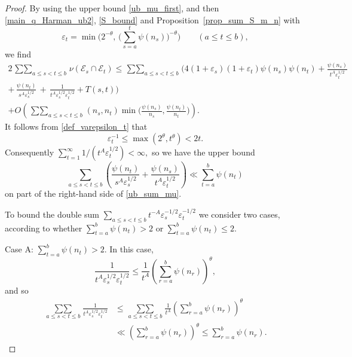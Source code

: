 \documentclass[12pt, reqno]{amsart}
\theoremstyle{definition}
\theoremstyle{remark}
\numberwithin{equation}{section}
\def\le{\leqslant} \def\ge{\geqslant}
\def\leq{\leqslant}
\def \cE {\mathcal E}
\begin{document}
\begin{proof}
By using the upper bound \eqref{ub_mu_first}, and then \eqref{main_q_Harman_ub2}, \eqref{S_bound} and Proposition~\ref{prop_sum_S_m_n}  with
\begin{equation} \label{def_varepsilon_t}
\varepsilon_t =
\min\Bigg(2^{-\theta},\, \Big( \sum_{s=a}^{t}\psi(n_s) \Big)^{-\theta}\Bigg)
\qquad (a \le t \le b),
\end{equation}
we find
\begin{multline} \label{ub_sum_mu}
2 \mathop{\sum\sum}_{a\leq s<t\leq b} \nu(\cE_{s}\cap \cE_{t}) \leq
\mathop{\sum\sum}_{a\leq s<t\leq b}
\Bigg(4(1+\varepsilon_s)(1+\varepsilon_t)\psi(n_s)\psi(n_t)+\frac{\psi(n_s)}{t^{A}\varepsilon_t^{1/2}}\,\\
+\, 
\frac{\psi(n_t)}{s^{A}\varepsilon_s^{1/2}}
\, + \, \frac{1}{t^{A}\varepsilon_s^{1/2}\varepsilon_t^{1/2}}+T(s,t)\Bigg)\\
+ O\left(\mathop{\sum\sum}_{a\leq s<t\leq b} (n_s,n_t)\min\Big(\frac{\psi(n_s)}{n_s},\frac{\psi(n_t)}{n_t}\Big)\right).
\end{multline}
It follows from \eqref{def_varepsilon_t} that
\begin{equation} \label{epsilon_inverse_bound}
\varepsilon_t^{-1} \leq \max\left(2^{\theta},t^{\theta}\right) < 2t.
\end{equation}
Consequently $\sum\limits_{t=1}^{\infty}1/(t^{A}\varepsilon_t^{1/2}) <\infty,$ so we have the  upper bound
\begin{equation} \label{ub_first_two_terms}
\sum_{a\leq s<t\leq b}\left(\frac{\psi(n_t)}{s^{A}\varepsilon_s^{1/2}} + \frac{\psi(n_s)}{t^{A}\varepsilon_t^{1/2}}\right)
\ll
\sum_{t=a}^b \psi(n_t)
\end{equation}
on part of the right-hand side of \eqref{ub_sum_mu}.

To bound the double sum $\sum\limits_{a\leq s<t\leq b} t^{-A}\varepsilon_s^{-1/2}\varepsilon_t^{-1/2}$ we consider two cases, according to whether $\sum\limits_{t=a}^{b}\psi(n_t)>2$ or $\sum\limits_{t=a}^{b}\psi(n_t)\leq 2$.

\noindent Case A: $\sum\limits_{t=a}^{b}\psi(n_t)>2$.  In this case,
\[
\frac{1}{t^{A}\varepsilon_s^{1/2}\varepsilon_t^{1/2}}
\leq
\frac{1}{t^{A}}\left(\sum_{r=a}^{b}\psi(n_r)\right)^{\theta},
\]
and so
\begin{equation}
\begin{aligned} \label{sum_const_leq_linear_case1}
	\mathop{\sum\sum}\limits_{a\leq s<t\leq b} \frac{1}{t^{A}\varepsilon_s^{1/2}\varepsilon_t^{1/2}} &\leq  \mathop{\sum\sum}\limits_{a\leq s<t\leq b} \frac{1}{t^{A}}\left(\sum_{r=a}^{b}\psi(n_r)\right)^{\theta} \\ &\ll \left(\sum_{r=a}^{b}\psi(n_r)\right)^{\theta}\leq \sum_{r=a}^{b}\psi(n_r).
\end{aligned}
\end{equation}


\end{proof}
\end{document}
